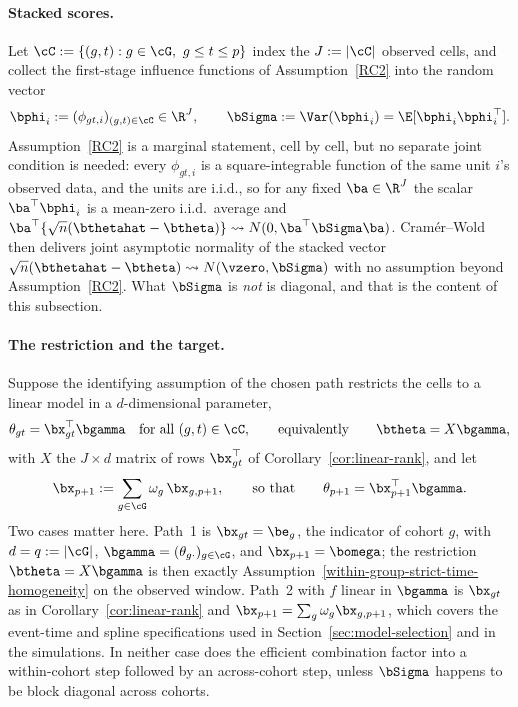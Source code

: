 \documentclass{article}
\begin{document}
\paragraph{Stacked scores.} Let $\cC := \{(g,t) : g \in \cG,\ g \leq t \leq p\}$ index the $J := |\cC|$ observed cells, and collect the first-stage influence functions of Assumption~\ref{RC2} into the random vector
\[
\bphi_i := (\phi_{gt,i})_{(g,t)\in\cC} \in \R^{J},
\qquad
\bSigma := \Var(\bphi_i) = \E[\bphi_i\bphi_i^{\top}].
\]
Assumption~\ref{RC2} is a marginal statement, cell by cell, but no separate joint condition is needed: every $\phi_{gt,i}$ is a square-integrable function of the same unit $i$'s observed data, and the units are i.i.d., so for any fixed $\ba \in \R^{J}$ the scalar $\ba^{\top}\bphi_i$ is a mean-zero i.i.d.\ average and $\ba^{\top}\{\sqrt n(\bthetahat - \btheta)\} \leadsto N(0, \ba^{\top}\bSigma\ba)$. Cram\'er--Wold then delivers joint asymptotic normality of the stacked vector $\sqrt n(\bthetahat-\btheta) \leadsto N(\vzero,\bSigma)$ with no assumption beyond Assumption~\ref{RC2}. What $\bSigma$ is \emph{not} is diagonal, and that is the content of this subsection.

\paragraph{The restriction and the target.} Suppose the identifying assumption of the chosen path restricts the cells to a linear model in a $d$-dimensional parameter,
\[
\theta_{gt} = \bx_{gt}^{\top}\bgamma
\quad \text{for all } (g,t)\in\cC,
\qquad\text{equivalently}\qquad
\btheta = X\bgamma,
\]
with $X$ the $J \times d$ matrix of rows $\bx_{gt}^{\top}$ of Corollary~\ref{cor:linear-rank}, and let
\[
\bx_{p+1} := \sum_{g\in\cG}\omega_g\,\bx_{g,p+1},
\qquad\text{so that}\qquad
\theta_{p+1} = \bx_{p+1}^{\top}\bgamma .
\]
Two cases matter here. Path~1 is $\bx_{gt} = \be_g$, the indicator of cohort $g$, with $d = q := |\cG|$, $\bgamma = (\theta_{g\cdot})_{g\in\cG}$, and $\bx_{p+1} = \bomega$; the restriction $\btheta = X\bgamma$ is then exactly Assumption~\ref{within-group-strict-time-homogeneity} on the observed window. Path~2 with $f$ linear in $\bgamma$ is $\bx_{gt}$ as in Corollary~\ref{cor:linear-rank} and $\bx_{p+1} = \sum_g \omega_g \bx_{g,p+1}$, which covers the event-time and spline specifications used in Section~\ref{sec:model-selection} and in the simulations. In neither case does the efficient combination factor into a within-cohort step followed by an across-cohort step, unless $\bSigma$ happens to be block diagonal across cohorts.
\end{document}
